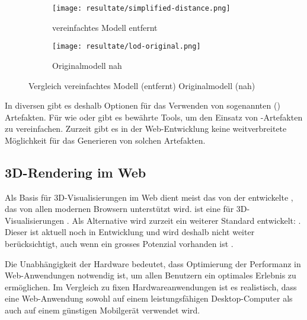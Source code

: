 \begin{figure}[H]
  \centering
  \begin{subfigure}{.4\textwidth}
    \centering
    \texttt{[image: resultate/simplified-distance.png]}
    \caption{vereinfachtes Modell entfernt}
    \label{fig:lodComparisonSimplified}
  \end{subfigure}
  \begin{subfigure}{.4\textwidth}
    \centering
    \texttt{[image: resultate/lod-original.png]}
    \caption{Originalmodell nah}
    \label{fig:lodComparisonOriginal}
  \end{subfigure}
  \caption{Vergleich vereinfachtes Modell (entfernt) Originalmodell (nah)}
\end{figure}

In diversen  gibt es deshalb Optionen für das Verwenden von sogenannten  () Artefakten.
Für  wie  oder  gibt es bewährte Tools, um den Einsatz von -Artefakten zu vereinfachen. Zurzeit gibt es in der Web-Entwicklung keine weitverbreitete Möglichkeit für das Generieren von solchen Artefakten.

\subsection{3D-Rendering im Web}

Als Basis für 3D-Visualisierungen im Web dient meist das von der  entwickelte , das von allen modernen Browsern unterstützt wird.  ist eine  für 3D-Visualisierungen \cite{webGl1Spec}.
Als Alternative wird zurzeit ein weiterer Standard entwickelt: . Dieser ist aktuell noch in Entwicklung und wird deshalb nicht weiter berücksichtigt, auch wenn ein grosses Potenzial vorhanden ist \cite{webGPUCharter}.

Die Unabhängigkeit der Hardware bedeutet, dass Optimierung der Performanz in Web-Anwendungen notwendig ist, um allen Benutzern ein optimales Erlebnis zu ermöglichen.
Im Vergleich zu fixen Hardwareanwendungen ist es realistisch, dass eine Web-Anwendung sowohl auf einem leistungsfähigen Desktop-Computer als auch auf einem günstigen Mobilgerät verwendet wird.

\pagebreak

